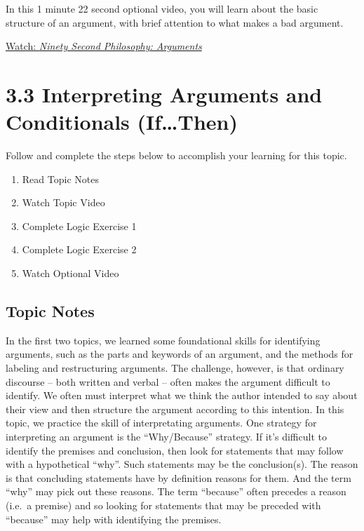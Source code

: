 \documentclass[
]{book}
\providecommand{\tightlist}{%
  \setlength{\itemsep}{0pt}\setlength{\parskip}{0pt}}
\begin{document}
\begin{reflect}
In this 1 minute 22 second optional video, you will learn about the basic structure of an argument, with brief attention to what makes a bad argument.

\href{https://www.youtube.com/watch?v=Z7f_uuy1JcM}{Watch: \emph{Ninety Second Philosophy: Arguments}}
\end{reflect}

\hypertarget{interpreting-arguments-and-conditionals-ifthen}{%
\section*{3.3 Interpreting Arguments and Conditionals (If\ldots Then)}\label{interpreting-arguments-and-conditionals-ifthen}}

Follow and complete the steps below to accomplish your learning for this topic.

\begin{enumerate}
\def\labelenumi{\arabic{enumi}.}
\tightlist
\item
  Read Topic Notes
\item
  Watch Topic Video
\item
  Complete Logic Exercise 1
\item
  Complete Logic Exercise 2
\item
  Watch Optional Video
\end{enumerate}

\hypertarget{topic-notes-10}{%
\subsection*{Topic Notes}\label{topic-notes-10}}

In the first two topics, we learned some foundational skills for identifying arguments, such as the parts and keywords of an argument, and the methods for labeling and restructuring arguments. The challenge, however, is that ordinary discourse -- both written and verbal -- often makes the argument difficult to identify. We often must interpret what we think the author intended to say about their view and then structure the argument according to this intention. In this topic, we practice the skill of interpretating arguments. One strategy for interpreting an argument is the ``Why/Because'' strategy. If it's difficult to identify the premises and conclusion, then look for statements that may follow with a hypothetical ``why''. Such statements may be the conclusion(s). The reason is that concluding statements have by definition reasons for them. And the term ``why'' may pick out these reasons. The term ``because'' often precedes a reason (i.e.~a premise) and so looking for statements that may be preceded with ``because'' may help with identifying the premises.
\end{document}
